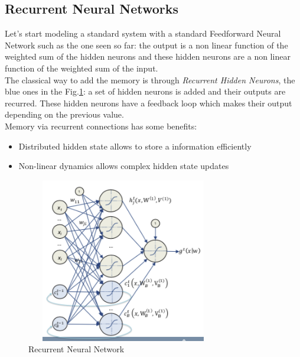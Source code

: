\subsection{Recurrent Neural Networks}
Let's start modeling a standard system with a standard Feedforward Neural Network such as the one seen so far: the output is a non linear function of the weighted sum of the hidden neurons and these hidden neurons are a non linear function of the weighted sum of the input. \\ 
The classical way to add the memory is through \textit{Recurrent Hidden Neurons}, the blue ones in the Fig.\ref{wrap-fig:rnn}: a set of hidden neurons is added and their outputs are recurred. These hidden neurons have a feedback loop which makes their output depending on the previous value. \\
Memory via recurrent connections has some benefits:
\begin{itemize}
    \item Distributed hidden state allows to store a information efficiently
    \item Non-linear dynamics allows complex hidden state updates
\end{itemize}{}

\begin{figure}
\includegraphics[width=8.5cm, height=7.2cm]{images/rnn.png}
\caption{Recurrent Neural Network}\label{wrap-fig:rnn}
\end{figure} 
 
